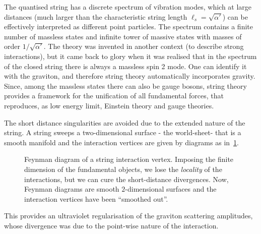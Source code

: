 \documentclass[draft]{phd}
\begin{document}
The quantised string has a discrete spectrum of vibration modes, which at large distances (much larger than the characteristic string length $\ell_s = \sqrt{\alpha'}$) can be effectively
interpreted as different point particles. 
The spectrum contains a finite number of massless states and infinite tower of massive states with masses of order   $1/\sqrt{\alpha'}$.
The theory was invented in another context (to describe strong interactions), but it came back to glory when it was realised that in the spectrum of the closed string there is always a massless spin 2 mode. One can identify it with the graviton, and therefore string theory automatically incorporates gravity.  Since, among the massless states there can also be
gauge bosons,   string theory provides a framework for the unification of all fundamental forces, that reproduces, as low energy limit, Einstein  theory and gauge theories.


		
The short distance singularities are avoided due to the extended nature of  the string.  A string sweeps a two-dimensional surface - the world-sheet-  that is a smooth manifold and the interaction vertices are given by diagrams as in~\cref{stringdiagram}.
				\begin{figure}[ht]
					\centering
						\scalebox{1.3}{}
					\caption{Feynman diagram of a string interaction vertex. 
						Imposing the finite dimension of the fundamental objects, we lose the \emph{locality} of the interactions, but we can cure the short-distance divergences.
						Now, Feynman diagrams are smooth $2$-dimensional surfaces and the interaction vertices have been ``smoothed out''.
					 }
					\label{stringdiagram}
				\end{figure}
This provides an ultraviolet regularisation of the graviton scattering amplitudes, whose divergence was due to the point-wise nature of the interaction.
		
\end{document}
